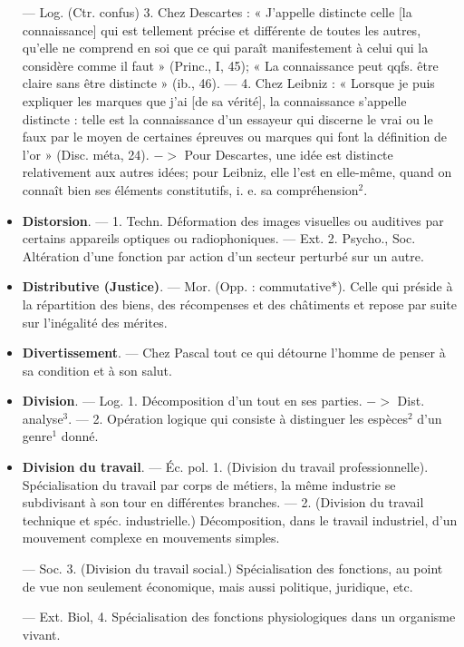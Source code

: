 \begin{itemize}[leftmargin=1cm, label=, itemsep=1pt]
— Log. (Ctr. confus) 3. Chez
Descartes : « J’appelle distincte celle
[la connaissance] qui est tellement
précise et différente de toutes les
autres, qu'elle ne comprend en soi
que ce qui paraît manifestement à
celui qui la considère comme il faut »
(Princ., I, 45); « La connaissance
peut qqfs. être claire sans être distincte » (ib., 46). — 4. Chez Leibniz :
« Lorsque je puis expliquer les marques que j'ai [de sa vérité], la connaissance s’appelle distincte : telle
est la connaissance d’un essayeur
qui discerne le vrai ou le faux par
le moyen de certaines épreuves ou
marques qui font la définition de
l'or » (Disc. méta, 24). $->$ Pour
Descartes, une idée est distincte
relativement aux autres idées; pour
Leibniz, elle l’est en elle-même,
quand on connaît bien ses éléments
constitutifs, i. e. sa compréhension$^2$.

\item {\bf Distorsion}. — 1. Techn. Déformation
des images visuelles ou auditives par
certains appareils optiques ou radiophoniques. — Ext. 2. Psycho., Soc.
Altération d’une fonction par action
d’un secteur perturbé sur un autre.

\item {\bf Distributive (Justice)}. — Mor. (Opp. :
commutative*). Celle qui préside à la
répartition des biens, des récompenses et des châtiments et repose
par suite sur l'inégalité des mérites.

\item {\bf Divertissement}. — Chez Pascal
tout ce qui détourne l’homme de
penser à sa condition et à son salut.

\item {\bf Division}. — Log. 1. Décomposition
d'un tout en ses parties. $->$ Dist.
analyse$^3$. — 2. Opération logique
qui consiste à distinguer les espèces$^2$
d'un genre$^1$ donné.

\item {\bf Division du travail}. — Éc. pol. 1. (Division du travail professionnelle). Spécialisation du travail par corps de
métiers, la même industrie se subdivisant à son tour en différentes
branches. — 2. (Division du travail
technique et spéc. industrielle.) Décomposition, dans le travail industriel, d’un mouvement complexe en
mouvements simples.

— Soc. 3. (Division du travail
social.) Spécialisation des fonctions,
au point de vue non seulement
économique, mais aussi politique,
juridique, etc.

— Ext. Biol, 4. Spécialisation
des fonctions physiologiques dans un
organisme vivant.


\end{itemize}
